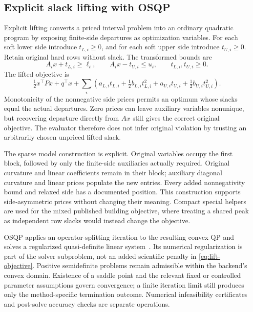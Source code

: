 \subsection{Explicit slack lifting with OSQP}\label{sec:lift}
Explicit lifting converts a priced interval problem into an ordinary quadratic
program by exposing finite-side departures as optimization variables. For each
soft lower side introduce $t_{L,i}\geq0$, and for each soft upper side introduce
$t_{U,i}\geq0$. Retain original hard rows without slack. The transformed bounds
are
\begin{equation}\label{eq:lift-constraints}
 A_i x+t_{L,i}\geq\ell_i,\qquad A_i x-t_{U,i}\leq u_i,
 \qquad t_{L,i},t_{U,i}\geq0.
\end{equation}
The lifted objective is
\begin{equation}\label{eq:lift-objective}
 \tfrac12x^\top P x+q^\top x+
 \sum_i\left(a_{L,i}t_{L,i}+\tfrac12 b_{L,i}t_{L,i}^2
             +a_{U,i}t_{U,i}+\tfrac12 b_{U,i}t_{U,i}^2\right).
\end{equation}
Monotonicity of the nonnegative side prices permits an optimum whose slacks equal
the actual departures. Zero prices can leave auxiliary variables nonunique, but
recovering departure directly from $Ax$ still gives the correct original
objective. The evaluator therefore does not infer original violation by trusting
an arbitrarily chosen unpriced lifted slack.

The sparse model construction is explicit. Original variables occupy the first
block, followed by only the finite-side auxiliaries actually required. Original
curvature and linear coefficients remain in their block; auxiliary diagonal
curvature and linear prices populate the new entries. Every added nonnegativity
bound and relaxed side has a documented position. This construction supports
side-asymmetric prices without changing their meaning. Compact special helpers
are used for the mixed published building objective, where treating a shared peak
as independent row slacks would instead change the objective.

OSQP applies an operator-splitting iteration to the resulting convex QP and
solves a regularized quasi-definite linear system~\cite{osqp}. Its numerical
regularization is part of the solver subproblem, not an added scientific penalty
in \eqref{eq:lift-objective}. Positive semidefinite problems remain admissible
within the backend's convex domain. Existence of a saddle point and the relevant
fixed or controlled parameter assumptions govern convergence; a finite iteration
limit still produces only the method-specific termination outcome. Numerical
infeasibility certificates and post-solve accuracy checks are separate operations.

